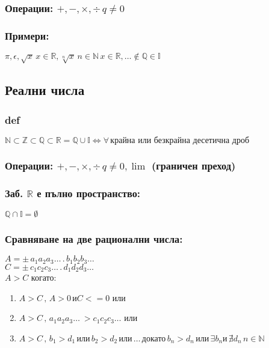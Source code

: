 \documentclass{article}
\begin{document}
    \subsubsection{Операции: \(+, -, \times, \div \, q \neq 0\)}
    \subsubsection{Примери:}
    \(\pi, \epsilon, \sqrt{x} \, x \in \mathbb{R}, \sqrt[n]{x} \, n \in \mathbb{N} \, x \in \mathbb{R}, \dots \notin \mathbb{Q} \in \mathbb{I}\)
    \subsection{Реални числа}
    \subsubsection{def}
    \(\mathbb{N} \subset \mathbb{Z} \subset \mathbb{Q} \subset \mathbb{R} =  \mathbb{Q} \cup \mathbb{I} \iff \forall \, \text{крайна или безкрайна десетична дроб}\)
    \subsubsection{Операции: \(+, -, \times, \div \, q \neq 0, \lim\) (граничен преход)}
    \subsubsection{Заб. \(\mathbb{R}\) е пълно пространство:}
    \(\mathbb{Q} \cap \mathbb{I} = \emptyset\)
    \subsubsection{Сравняване на две рационални числа:}
    \(A = \pm \, a_1 a_2 a_3 \dots \, . \, b_1 b_2 b_3 \dots\)\\
    \(C = \pm \, c_1 c_2 c_3 \dots \, . \, d_1 d_2 d_3 \dots\)\\
    \(A > C\) когато:
    \begin{enumerate}
        \item \(A > C \, , \, A > 0 \, \text{и} C <= 0\) или
        \item \(A > C \, , \, a_1 a_2 a_3 \dots \ > c_1 c_2 c_3 \dots\) или
        \item \(A > C \, , \, b_1 > d_1 \, \text{или} \, b_2 > d_2 \, \text{или} \, \dots \, \text{докато} \, b_n > d_n \, \text{или} \, \exists b_n \text{и} \, \nexists d_n \, n \in \mathbb{N}\)
    \end{enumerate}
\end{document}

